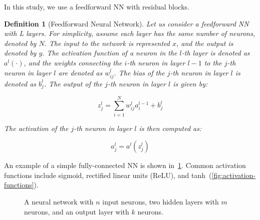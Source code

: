 \documentclass[ppgc,diss,english]{iiufrgs}
\newtheorem{definition}{Definition}
\begin{document}
In this study, we use a feedforward NN with residual blocks.

\begin{definition}[Feedforward Neural Network]
Let us consider a feedforward NN with L layers. For simplicity, assume each layer has the same number of neurons, denoted by $N$. The input to the network is represented $x$, and the output is denoted by $y$. The activation function of a neuron in the $l$-th layer is denoted as $a^l(\cdot)$, and the weights connecting the $i$-th neuron in layer $l-1$ to the $j$-th neuron in layer $l$ are denoted as $w^{l}_{ij}$. The bias of the $j$-th neuron in layer $l$ is denoted as $b^{l}_{j}$. The output of the $j$-th neuron in layer $l$ is given by:

$$z^{l}_{j} = \sum_{i=1}^{N} w^{l}_{ij} a^{l-1}_{i} + b^{l}_{j}$$

The activation of the $j$-th neuron in layer $l$ is then computed as:

$$a^{l}_{j} = a^{l}(z^{l}_{j})$$
\end{definition}

An example of a simple fully-connected NN is shown in~\cref{fig:neural-network}. Common activation functions include sigmoid, rectified linear units (ReLU), and tanh~(\cref{fig:activation-functions}).

\begin{figure}[tb]
\caption[A fully-connected neural network]{A neural network with $n$ input neurons, two hidden layers with $m$ neurons, and an output layer with $k$ neurons.}
\vspace{\baselineskip}
\centering
{}
\label{fig:neural-network}
\end{figure}
\end{document}
